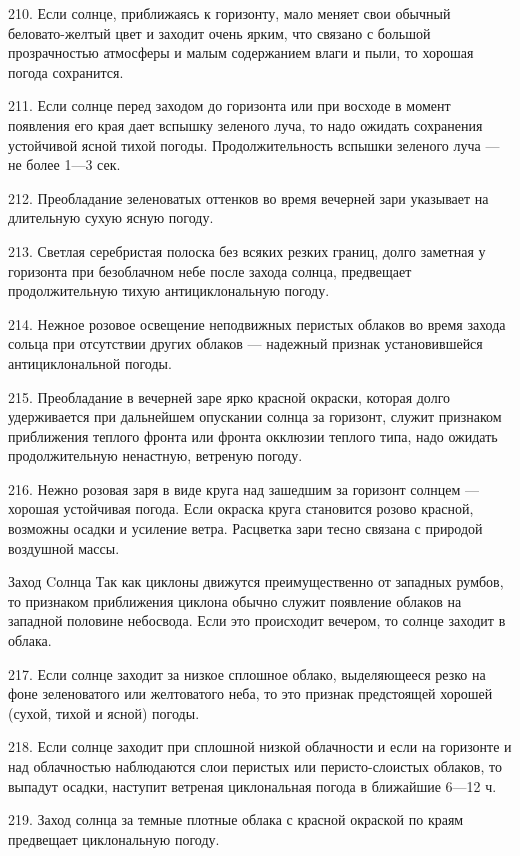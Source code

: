 210. Если солнце, приближаясь к горизонту, мало меняет свои обычный беловато-желтый цвет и заходит очень ярким, что связано с большой прозрачностью атмосферы и малым содержанием влаги и пыли, то хорошая погода сохранится.

211. Если солнце перед заходом до горизонта или при восходе в момент появления его края дает вспышку зеленого луча, то надо ожидать сохранения устойчивой ясной тихой погоды. Продолжительность вспышки зеленого луча — не более 1—3 сек.

212. Преобладание зеленоватых оттенков во время вечерней зари указывает на длительную сухую ясную погоду.

213. Светлая серебристая полоска без всяких резких границ, долго заметная у горизонта при безоблачном небе после захода солнца, предвещает продолжительную тихую антициклональную погоду.

214. Нежное розовое освещение неподвижных перистых облаков во время захода сольца при отсутствии других облаков — надежный признак установившейся антициклональной погоды.

215. Преобладание в вечерней заре ярко красной окраски, которая долго удерживается при дальнейшем опускании солнца за горизонт, служит признаком приближения теплого фронта или фронта окклюзии теплого типа, надо ожидать продолжительную ненастную, ветреную погоду.

216. Нежно розовая заря в виде круга над зашедшим за горизонт солнцем — хорошая устойчивая погода. Если окраска круга становится розово красной, возможны осадки и усиление ветра. Расцветка зари тесно связана с природой воздушной массы.

Заход Cолнца
Так как циклоны движутся преимущественно от западных румбов, то признаком приближения циклона обычно служит появление облаков на западной половине небосвода. Если это происходит вечером, то солнце заходит в облака.

217. Если солнце заходит за низкое сплошное облако, выделяющееся резко на фоне зеленоватого или желтоватого неба, то это признак предстоящей хорошей (сухой, тихой и ясной) погоды.

218. Если солнце заходит при сплошной низкой облачности и если на горизонте и над облачностью наблюдаются слои перистых или перисто-слоистых облаков, то выпадут осадки, наступит ветреная циклональная погода в ближайшие 6—12 ч.

219. Заход солнца за темные плотные облака с красной окраской по краям предвещает циклональную погоду.

